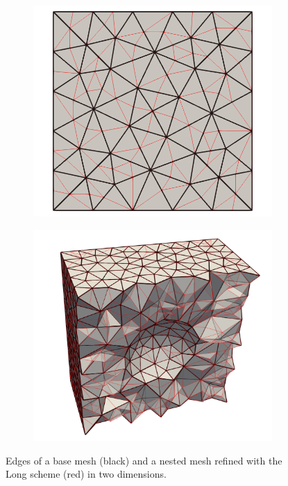 \begin{figure}[ht!]
\centering
\begin{subfigure}{.5\textwidth}
\centering
\includegraphics[width=.9\linewidth]{img/refine_long_mesh.png}
\end{subfigure}%
\begin{subfigure}{.5\textwidth}
\centering
\includegraphics[width=.99\linewidth]{img/refine_long_mesh_3D.png}
\end{subfigure}
\caption{Edges of a base mesh (black) and a nested mesh refined
with the Long scheme (red) in two dimensions.}
\label{fig:long_mesh}
\end{figure}

